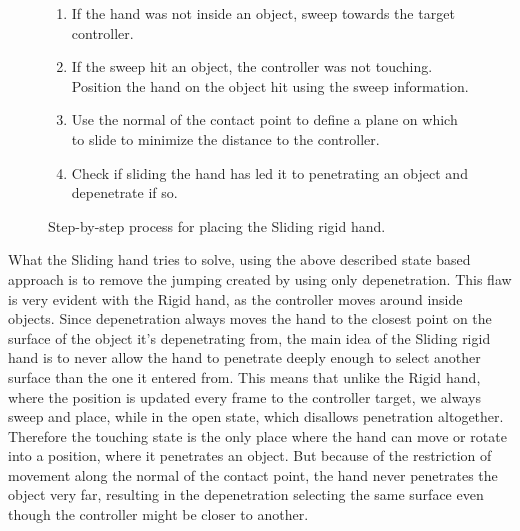 \begin{figure}[H]
\begin{minipage}[t]{0.49\textwidth}
\begin{enumerate}[noitemsep]
\item If the hand was not inside an object, sweep towards the target controller.
\item If the sweep hit an object, the controller was not touching. Position the hand on the object hit using the sweep information.
\item Use the normal of the contact point to define a plane on which to slide to minimize the distance to the controller.
\item Check if sliding the hand has led it to penetrating an object and depenetrate if so.
\end{enumerate}
\end{minipage}
\caption{Step-by-step process for placing the Sliding rigid hand.}
\label{fig:stepByStepSlidingRigidHand}
\end{figure}


What the Sliding hand tries to solve, using the above described state based approach is to remove the jumping created by using only depenetration. This flaw is very evident with the Rigid hand, as the controller moves around inside objects. Since depenetration always moves the hand to the closest point on the surface of the object it's depenetrating from, the main idea of the Sliding rigid hand is to never allow the hand to penetrate deeply enough to select another surface than the one it entered from. This means that unlike the Rigid hand, where the position is updated every frame to the controller target, we always sweep and place, while in the open state, which disallows penetration altogether. Therefore the touching state is the only place where the hand can move or rotate into a position, where it penetrates an object. But because of the restriction of movement along the normal of the contact point, the hand never penetrates the object very far, resulting in the depenetration selecting the same surface even though the controller might be closer to another.

